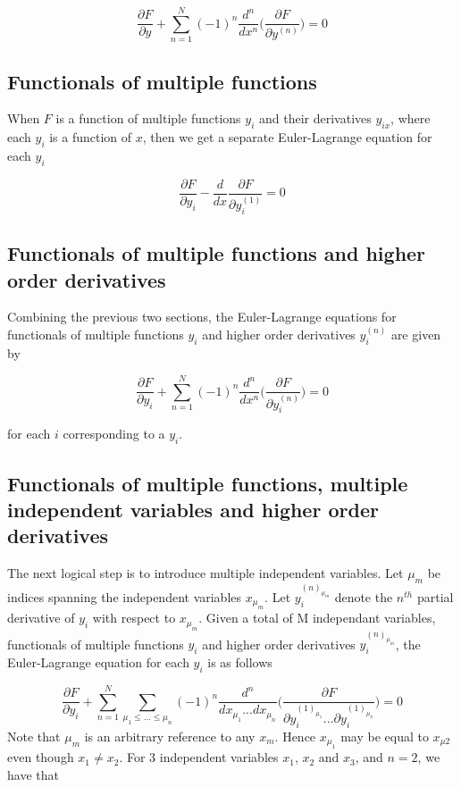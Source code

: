\documentclass[]{article}
\begin{document}
\begin{equation} \frac{\partial F}{\partial y} + \sum_{n=1}^{N} (-1)^{n}\frac{d^{n}}{dx^{n}} \bigg(\frac{\partial F}{\partial y^{(n)}}\bigg) = 0 \end{equation}  

\subsection{Functionals of multiple functions}
When $F$ is a function of multiple functions $y_{i}$ and their derivatives $y_{ix}$, where each $y_{i}$ is a function of $x$, then we get a separate Euler-Lagrange equation for each $y_{i}$

\begin{equation} \frac{\partial F}{\partial y_{i}} - \frac{d}{dx}\frac{\partial F}{\partial y_{i}^{(1)}} = 0 \end{equation}

\subsection{Functionals of multiple functions and higher order derivatives}
Combining the previous two sections, the Euler-Lagrange equations for functionals of multiple functions $y_{i}$ and higher order derivatives $y_{i}^{(n)}$ are given by

\begin{equation} \frac{\partial F}{\partial y_{i}} + \sum_{n=1}^{N} (-1)^{n}\frac{d^{n}}{dx^{n}} \bigg(\frac{\partial F}{\partial y^{(n)}_{i}}\bigg) = 0 \end{equation}  

for each $i$ corresponding to a $y_{i}$.

\subsection{Functionals of multiple functions, multiple independent variables and higher order derivatives}
The next logical step is to introduce multiple independent variables. Let $\mu_{m}$ be indices spanning the independent variables $x_{\mu_{m}}$. Let $y^{(n)_{\mu_{m}}}_{i}$ denote the $n^{th}$ partial derivative of $y_{i}$ with respect to $x_{\mu_{m}}$. Given a total of M independant variables, functionals of multiple functions $y_{i}$ and higher order derivatives $y^{(n)_{\mu_{m}}}_{i}$, the Euler-Lagrange equation for each $y_{i}$  is as follows

\begin{equation} \frac{\partial F}{\partial y_{i}} +  \sum_{n=1}^{N} \sum_{\mu_{1} \leq ...\leq \mu_{n}} (-1)^{n}\frac{d^{n}}{d x_{\mu_{1}}...d x_{\mu_{n}}} \bigg(\frac{\partial F}{\partial y^{(1)_{\mu_{1}}}_{i} ...\partial y^{(1)_{\mu_{n}}}_{i}}\bigg) = 0 \label{eulerlagrange_higherderivatives_functions_variables} \end{equation}  
Note that $\mu_{m}$ is an arbitrary reference to any $x_m$. Hence $x_{\mu_{1}}$ may be equal to $x_{\mu{2}}$ even though $x_{1} \neq x_{2}$. For $3$ independent variables $x_{1}$, $x_{2}$ and $x_{3}$, and $n=2$, we have that
\end{document}
